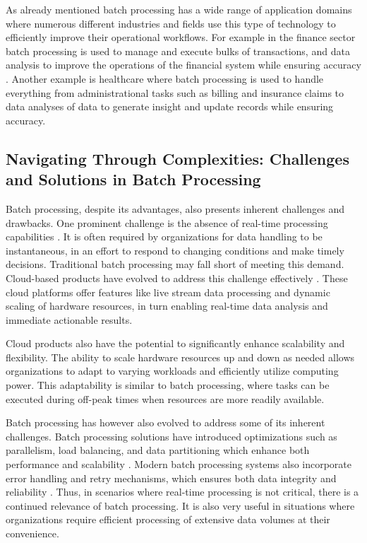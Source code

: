 \documentclass[10pt]{proc}
\begin{document}
As already mentioned batch processing has a wide range of application domains where numerous different industries and fields use this type of technology to efficiently improve their operational workflows. For example in the finance sector batch processing is used to manage and execute bulks of transactions, and data analysis to improve the operations of the financial system while ensuring accuracy \cite{advsysconBatchProcessing}. Another example is healthcare where batch processing is used to handle everything from administrational tasks such as billing and insurance claims to data analyses of data to generate insight and update records while ensuring accuracy. 

\subsection{Navigating Through Complexities: Challenges and Solutions in Batch Processing}

Batch processing, despite its advantages, also presents inherent challenges and drawbacks. One prominent challenge is the absence of real-time processing capabilities \cite{memphisdev}. It is often required by organizations for data handling to be instantaneous, in an effort to respond to changing conditions and make timely decisions. Traditional batch processing may fall short of meeting this demand. Cloud-based products have evolved to address this challenge effectively \cite{memphisdev}. These cloud platforms offer features like live stream data processing and dynamic scaling of hardware resources, in turn enabling real-time data analysis and immediate actionable results.

Cloud products also have the potential to significantly enhance scalability and flexibility\cite{memphisdev}. The ability to scale hardware resources up and down as needed allows organizations to adapt to varying workloads and efficiently utilize computing power. This adaptability is similar to batch processing, where tasks can be executed during off-peak times when resources are more readily available.

Batch processing has however also evolved to address some of its inherent challenges. Batch processing solutions have introduced optimizations such as parallelism, load balancing, and data partitioning which enhance both performance and scalability \cite{memphisdev}. Modern batch processing systems also incorporate error handling and retry mechanisms, which ensures both data integrity and reliability \cite{memphisdev}. Thus, in scenarios where real-time processing is not critical, there is a continued relevance of batch processing.  It is also very useful in situations where organizations require efficient processing of extensive data volumes at their convenience.
\end{document}
